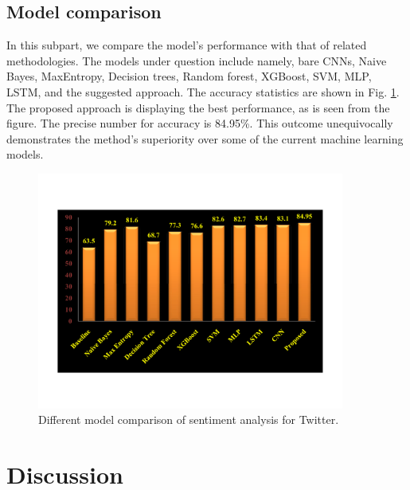\subsection{Model comparison}

In this subpart, we compare the model's performance with that of related methodologies.
The models under question include namely, bare CNNs, Naive Bayes, MaxEntropy, Decision trees, Random forest, XGBoost, SVM, MLP, LSTM, and the suggested approach. The accuracy statistics are shown in Fig. \ref{accuracyy}. The proposed approach is displaying the best performance, as is seen from the figure. The precise number for accuracy is 84.95\%. This outcome unequivocally demonstrates the method's superiority over some of the current machine learning models. 


\begin{figure}[t]
\centering
\includegraphics[width=0.9\textwidth]{res.pdf}
\caption{Different model comparison of sentiment analysis for Twitter.}
\label{accuracyy}
\end{figure}

\section{Discussion}

